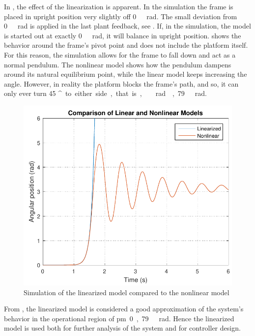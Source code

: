 %
In , the effect of the linearization is apparent. In the simulation the frame is placed in upright position very slightly off \si{0\ rad}. The small deviation from \si{0\ rad} is applied in the last plant feedback, see . If, in the simulation, the model is started out at exactly \si{0\ rad}, it will balance in upright position.
 shows the behavior around the frame's pivot point and does not include the platform itself. For this reason, the simulation allows for the frame to fall down and act as a normal pendulum. The nonlinear model shows how the pendulum dampens around its natural equilibrium point, while the linear model keeps increasing the angle.
However, in reality the platform blocks the frame's path, and so, it can only ever turn \si{45 ^\circ} to either side, that is, \si{\ rad ,79\ rad}.
\begin{figure}[H] 
	\centering 
	\includegraphics[scale=0.55]{figures/LinearizedVSNonlinear}
	\caption{Simulation of the linearized model compared to the nonlinear model}
	\label{LinearizedVSNonlinear}
\end{figure}
From , the linearized model is considered a good approximation of the system's behavior in the operational region of \si{\pm 0,79\ rad}. Hence the linearized model is used both for further analysis of the system and for controller design.